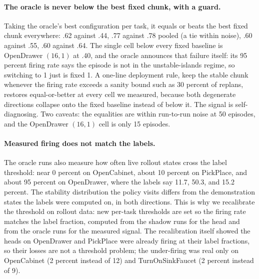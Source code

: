 \documentclass[11pt]{article}
\begin{document}
\paragraph{The oracle is never below the best fixed chunk, with a guard.}
Taking the oracle's best configuration per task, it equals or beats the
best fixed chunk everywhere: .62 against .44, .77 against .78 pooled (a
tie within noise), .60 against .55, .60 against .64. The single cell below every fixed baseline is
OpenDrawer $(16,1)$ at .40, and the oracle announces that failure itself:
its 95 percent firing rate says the episode is not in the
unstable-islands regime, so switching to 1 just is fixed 1. A one-line
deployment rule, keep the stable chunk whenever the firing rate exceeds a
sanity bound such as 30 percent of replans, restores equal-or-better at
every cell we measured, because both degenerate directions collapse onto
the fixed baseline instead of below it. The signal is self-diagnosing.
Two caveats: the equalities are within run-to-run noise at 50 episodes,
and the OpenDrawer $(16,1)$ cell is only 15 episodes.

\paragraph{Measured firing does not match the labels.}
The oracle runs also measure how often live rollout states cross the label
threshold: near 0 percent on OpenCabinet, about 10 percent on PickPlace, and
about 95 percent on OpenDrawer, where the labels say 11.7, 50.3, and 15.2
percent. The stability distribution the policy visits differs from the
demonstration states the labels were computed on, in both directions. This
is why we recalibrate the threshold on rollout data: new per-task thresholds
are set so the firing rate matches the label fraction, computed from the
shadow runs for the head and from the oracle runs for the measured signal.
The recalibration itself showed the heads on OpenDrawer and PickPlace were
already firing at their label fractions, so their losses are not a threshold
problem; the under-firing was real only on OpenCabinet (2 percent instead of
12) and TurnOnSinkFaucet (2 percent instead of 9).
\end{document}
